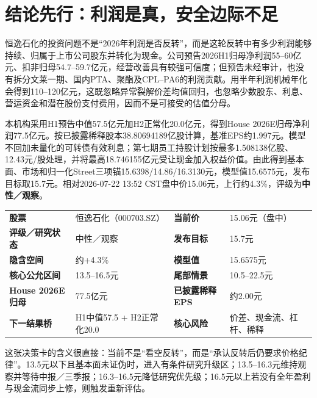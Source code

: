 \section{结论先行：利润是真，安全边际不足}

恒逸石化的投资问题不是“2026年利润是否反转”，而是这轮反转中有多少利润能够持续、归属于上市公司股东并转化为现金。公司预告2026H1归母净利润55--60亿元、扣非归母54.7--59.7亿元，经营改善具有较强可信度；但预告未经审计，也没有拆分文莱一期、国内PTA、聚酯及CPL--PA6的利润贡献。用半年利润机械年化会得到110--120亿元，这既忽略异常裂解价差均值回归，也忽略少数股东、利息、营运资金和潜在股份支付费用，因而不是可接受的估值分母。

本机构采用H1预告中值57.5亿元加H2正常化20.0亿元，得到House 2026E归母净利润77.5亿元。按已披露稀释股本38.80694189亿股计算，基准EPS约1.997元。模型不回加未量化的可转债有效利息；第七期员工持股计划按最多1.508138亿股、12.43元/股处理，并将最高18.746155亿元受让现金加入权益价值。由此得到基本面、市场和归一化Street三项锚15.6398/14.86/16.3130元，模型值15.6575元，发布目标取15.7元。相对2026-07-22 13:52 CST盘中价15.06元，上行约4.3\%，评级为\textbf{中性／观察}。

\begin{dashboardbox}[IC决策卡]
\noindent\begin{tabularx}{\textwidth}{L{2.8cm}X L{2.8cm}X}
\textbf{股票} & 恒逸石化（000703.SZ） & \textbf{当前价} & 15.06元（盘中） \\
\textbf{评级／研究状态} & 中性／观察 & \textbf{发布目标} & 15.7元 \\
\textbf{隐含空间} & 约+4.3\% & \textbf{模型值} & 15.6575元 \\
\textbf{核心公允区间} & 13.5--16.5元 & \textbf{尾部情景} & 10.5--22.5元 \\
\textbf{House 2026E归母} & 77.5亿元 & \textbf{已披露稀释EPS} & 约2.00元 \\
\textbf{下一结果桥} & H1中值57.5 + H2正常化20.0 & \textbf{核心风险} & 价差、现金流、杠杆、稀释 \\
\bottomrule
\end{tabularx}
\end{dashboardbox}

这张决策卡的含义很直接：当前不是“看空反转”，而是“承认反转后仍要求价格纪律”。13.5元以下且基本面未证伪时，进入有条件研究升级区；13.5--16.3元维持观察并等待中报／三季报；16.3--16.5元降低研究优先级；16.5元以上若没有全年盈利与现金流同步上修，则触发重新评估。

